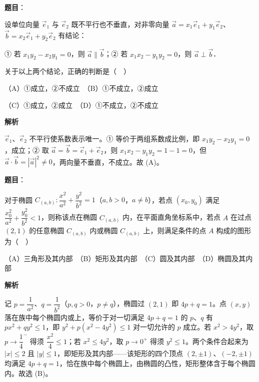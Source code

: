 \begin{answer}

\textbf{题目}：

设单位向量 \(\vec{e}_{1}\) 与 \(\vec{e}_{2}\) 既不平行也不垂直，对非零向量 \(\vec{a}=x_{1}\vec{e}_{1}+y_{1}\vec{e}_{2}\)、\(\vec{b}=x_{2}\vec{e}_{1}+y_{2}\vec{e}_{2}\) 有结论：

① 若 \(x_{1}y_{2}-x_{2}y_{1}=0\)，则 \(\vec{a}\parallel\vec{b}\)；② 若 \(x_{1}x_{2}-y_{1}y_{2}=0\)，则 \(\vec{a}\perp\vec{b}\)．

关于以上两个结论，正确的判断是（　）

（A）①成立，②不成立　（B）①不成立，②成立

（C）①成立，②成立　（D）①不成立，②不成立

\textbf{解析}

\(\vec{e}_{1}\)、\(\vec{e}_{2}\) 不平行使系数表示唯一。① 等价于两组系数成比例，即 \(x_{1}y_{2}-x_{2}y_{1}=0\)，成立；② 取 \(\vec{a}=\vec{b}=\vec{e}_{1}+\vec{e}_{2}\)，则 \(x_{1}x_{2}-y_{1}y_{2}=1-1=0\)，但 \(\vec{a}\cdot\vec{b}=|\vec{a}|^{2}\neq 0\)，两向量不垂直，不成立。故 (A)。


\end{answer}
\begin{answer}

\textbf{题目}：

对于椭圆 \(C_{(a,b)}:\dfrac{x^{2}}{a^{2}}+\dfrac{y^{2}}{b^{2}}=1\)（\(a,b>0\)，\(a\neq b\)），若点 \((x_{0},y_{0})\) 满足 \(\dfrac{x_{0}^{2}}{a^{2}}+\dfrac{y_{0}^{2}}{b^{2}}<1\)，则称该点在椭圆 \(C_{(a,b)}\) 内，在平面直角坐标系中，若点 \(A\) 在过点 \((2,1)\) 的任意椭圆 \(C_{(a,b)}\) 内或椭圆 \(C_{(a,b)}\) 上，则满足条件的点 \(A\) 构成的图形为（　）

（A）三角形及其内部　（B）矩形及其内部　（C）圆及其内部　（D）椭圆及其内部

\textbf{解析}

记 \(p=\dfrac{1}{a^{2}}\)、\(q=\dfrac{1}{b^{2}}\)（\(p,q>0\)，\(p\neq q\)），椭圆过 \((2,1)\) 即 \(4p+q=1\)。点 \((x,y)\) 落在族中每个椭圆内或上，等价于对一切满足 \(4p+q=1\) 的 \(p\)、\(q\) 有 \(px^{2}+qy^{2}\leqslant 1\)，即 \(y^{2}+p(x^{2}-4y^{2})\leqslant 1\) 对一切允许的 \(p\) 成立。若 \(x^{2}>4y^{2}\)，取 \(p\to\dfrac{1}{4}^{-}\) 得须 \(\dfrac{x^{2}}{4}\leqslant 1\)；若 \(x^{2}\leqslant 4y^{2}\)，取 \(p\to 0^{+}\) 得须 \(y^{2}\leqslant 1\)。两个条件合起来为 \(|x|\leqslant 2\) 且 \(|y|\leqslant 1\)，即矩形及其内部——该矩形的四个顶点 \((2,\pm 1)\)、\((-2,\pm 1)\) 均满足 \(4p+q=1\)，恰在族中每个椭圆上，由椭圆的凸性，矩形整体含于每个椭圆内。故选 (B)。


\end{answer}
